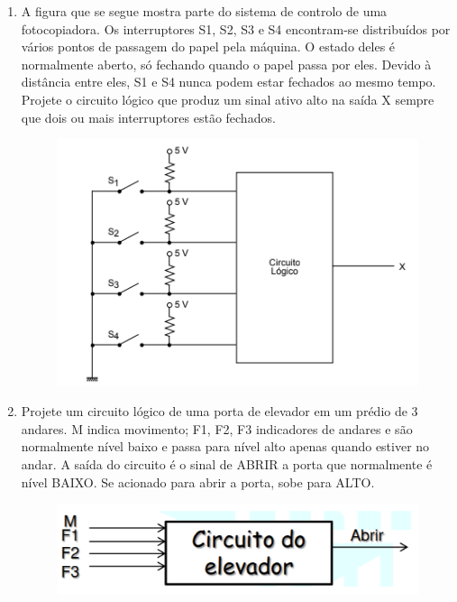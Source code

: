 \documentclass[12pt,onepage,a4paper]{memoir}
\begin{document}
\begin{enumerate}
    \item A figura que se segue mostra parte do sistema de controlo de uma fotocopiadora. Os interruptores S1, S2, S3 e S4 encontram-se distribuídos por vários pontos de passagem do papel pela máquina. O estado deles é normalmente aberto, só fechando quando o papel passa por eles. Devido à distância entre eles, S1 e S4 nunca podem estar fechados ao mesmo tempo. Projete o circuito lógico que produz um sinal ativo alto na saída X sempre que dois ou mais interruptores estão fechados.

    \begin{figure}[H]
        \centering
        \includegraphics[scale=0.6]{fig/copiadora.png}
        \label{fig:copiadora}
    \end{figure}

    \item Projete um circuito lógico de uma porta de elevador em um prédio de 3 andares. M indica movimento; F1, F2, F3 indicadores de andares e são normalmente nível baixo e passa para nível alto apenas quando estiver no andar. A saída do circuito é o sinal de ABRIR a porta que normalmente é nível BAIXO. Se acionado para abrir a porta, sobe para ALTO.

    \begin{figure}[H]
        \centering
        \includegraphics[scale=0.6]{fig/elevador.png}
        \label{fig:elevador}
    \end{figure}


\end{enumerate}
\end{document}
